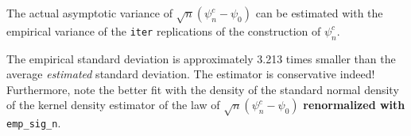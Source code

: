 \documentclass[11pt,openright,twoside]{book}
\newenvironment{Shaded}{\begin{snugshade}}{\end{snugshade}}
\newcommand{\CommentTok}[1]{\textcolor[rgb]{0.56,0.35,0.01}{\textit{#1}}}
\newcommand{\KeywordTok}[1]{\textcolor[rgb]{0.13,0.29,0.53}{\textbf{#1}}}
\newcommand{\NormalTok}[1]{#1}
\newcommand{\OperatorTok}[1]{\textcolor[rgb]{0.81,0.36,0.00}{\textbf{#1}}}
\newcommand{\StringTok}[1]{\textcolor[rgb]{0.31,0.60,0.02}{#1}}
\theoremstyle{definition}
\theoremstyle{definition}
\theoremstyle{definition}
\theoremstyle{remark}
\begin{document}
The actual asymptotic variance of \(\sqrt{n} (\psi_{n}^{c} - \psi_{0})\) can be
estimated with the empirical variance of the \texttt{iter} replications of the
construction of \(\psi_{n}^{c}\).

\begin{Shaded}
\end{Shaded}

The empirical standard deviation is approximately
3.213 times smaller than the average
\emph{estimated} standard deviation. The estimator is conservative indeed!
Furthermore, note the better fit with the density of the standard normal
density of the kernel density estimator of the law of \(\sqrt{n} (\psi_{n}^{c} - \psi_{0})\) \textbf{renormalized with} \texttt{emp\_sig\_n}.
\end{document}
